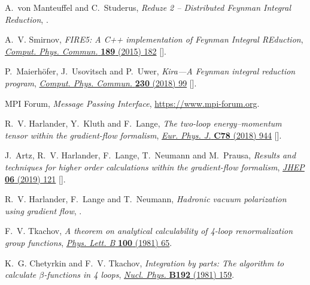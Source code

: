 \documentclass[11pt,a4paper,DIV=11,numbers=noenddot,parskip=half]{scrartcl}
\begin{document}
\begin{thebibliography}{10}
A.~von Manteuffel and C.~Studerus, \emph{{Reduze 2 -- Distributed Feynman
  Integral Reduction}},  \href{https://arxiv.org/abs/1201.4330}{{}}.

A.~V. Smirnov, \emph{{FIRE5: A C++ implementation of Feynman Integral
  REduction}}, \href{https://doi.org/10.1016/j.cpc.2014.11.024}{\emph{Comput.
  Phys. Commun.} {\bfseries 189} (2015) 182}
  [\href{https://arxiv.org/abs/1408.2372}{{}}].

P.~Maierhöfer, J.~Usovitsch and P.~Uwer, \emph{{Kira—A Feynman integral
  reduction program}},
  \href{https://doi.org/10.1016/j.cpc.2018.04.012}{\emph{Comput. Phys. Commun.}
  {\bfseries 230} (2018) 99}
  [\href{https://arxiv.org/abs/1705.05610}{{}}].

{MPI Forum}, \emph{{Message Passing Interface}},
  \href{https://www.mpi-forum.org}{https://www.mpi-forum.org}.

R.~V. Harlander, Y.~Kluth and F.~Lange, \emph{{The two-loop energy–momentum
  tensor within the gradient-flow formalism}},
  \href{https://doi.org/10.1140/epjc/s10052-018-6415-7}{\emph{Eur. Phys. J.}
  {\bfseries C78} (2018) 944}
  [\href{https://arxiv.org/abs/1808.09837}{{}}].

J.~Artz, R.~V. Harlander, F.~Lange, T.~Neumann and M.~Prausa, \emph{{Results
  and techniques for higher order calculations within the gradient-flow
  formalism}}, \href{https://doi.org/10.1007/JHEP06(2019)121}{\emph{JHEP}
  {\bfseries 06} (2019) 121}
  [\href{https://arxiv.org/abs/1905.00882}{{}}].

R.~V. Harlander, F.~Lange and T.~Neumann, \emph{{Hadronic vacuum polarization
  using gradient flow}},  \href{https://arxiv.org/abs/2007.01057}{{}}.

F.~V. Tkachov, \emph{{A theorem on analytical calculability of 4-loop
  renormalization group functions}},
  \href{https://doi.org/10.1016/0370-2693(81)90288-4}{\emph{Phys. Lett. B}
  {\bfseries 100} (1981) 65}.

K.~G. Chetyrkin and F.~V. Tkachov, \emph{{Integration by parts: The algorithm
  to calculate $\beta$-functions in 4 loops}},
  \href{https://doi.org/10.1016/0550-3213(81)90199-1}{\emph{Nucl. Phys.}
  {\bfseries B192} (1981) 159}.


\end{thebibliography}
\end{document}
